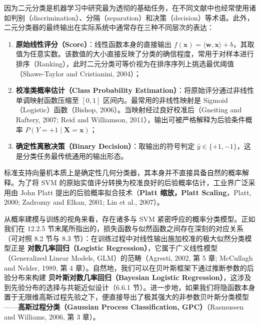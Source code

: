 因为二元分类是机器学习中研究最为透彻的基础任务，在不同文献中也经常使用诸如判别（discrimination）、分隔（separation）和决策（decision）等术语。此外，二元分类器的最终输出在实际系统中通常存在三种不同层次的表达：

\begin{enumerate}
\item \textbf{原始线性评分（Score）}：线性函数本身的直接输出 $ f(\boldsymbol{x}) = \langle \boldsymbol{w}, \boldsymbol{x} \rangle + b $，其取值为任意实数。该数值的大小直接反映了分类的确信程度，常用于对样本进行排序（Ranking），此时二元分类可等价视为在排序序列上挑选最优阈值（Shawe-Taylor and Cristianini, 2004）；
\item \textbf{校准类概率估计（Class Probability Estimation）}：将原始评分通过非线性单调映射函数压缩至 $ [0, 1] $ 区间内。最常用的非线性映射是 Sigmoid（Logistic）函数（Bishop, 2006）。当映射经过良好校准后（Gneiting and Raftery, 2007; Reid and Williamson, 2011），输出可被严格解释为后验条件概率 $ P(Y = +1 \mid \boldsymbol{X} = \boldsymbol{x}) $；
\item \textbf{确定性离散决策（Binary Decision）}：取输出的符号判定 $ \hat{y} \in \{+1, -1\} $，这是分类任务最传统通用的输出形态。
\end{enumerate}

标准支持向量机本质上是确定性几何分类器，其本身并不直接具备自然的概率解释。为了将 SVM 的原始实值评分转换为校准良好的后验概率估计，工业界广泛采用由 John Platt 提出的后验概率拟合技术（\textbf{Platt 缩放，Platt Scaling}，Platt, 2000; Zadrozny and Elkan, 2001; Lin et al., 2007）。

从概率建模与训练的视角来看，存在诸多与 SVM 紧密呼应的概率分类模型。正如我们在 12.2.5 节末尾所指出的，损失函数与似然函数之间存在深刻的对应关系（可对照 8.2 节与 8.3 节）：在训练过程中对线性输出施加校准的极大似然分类模型正是 \textbf{对数几率回归（Logistic Regression）}，它属于广义线性模型（Generalized Linear Models, GLM）的范畴（Agresti, 2002, 第 5 章; McCullagh and Nelder, 1989, 第 4 章）。自然地，我们可以在贝叶斯框架下通过推断参数的后验分布来构建 \textbf{贝叶斯对数几率回归（Bayesian Logistic Regression）}，这涉及到先验分布的选择与共轭近似设计（6.6.1 节）。进一步地，如果我们将隐函数本身置于无限维高斯过程先验之下，便直接导出了极其强大的非参数贝叶斯分类模型——\textbf{高斯过程分类（Gaussian Process Classification, GPC）}（Rasmussen and Williams, 2006, 第 3 章）。
